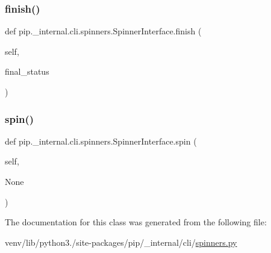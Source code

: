 \subsubsection{\texorpdfstring{finish()}{finish()}}
{\footnotesize\ttfamily def pip.\+\_\+internal.\+cli.\+spinners.\+Spinner\+Interface.\+finish (\begin{DoxyParamCaption}\item[{}]{self,  }\item[{}]{final\+\_\+status }\end{DoxyParamCaption})}

\mbox{\label{classpip_1_1__internal_1_1cli_1_1spinners_1_1SpinnerInterface_ab9ee9b6a6fbfbb7306e9e24d2f247703}} 
\subsubsection{\texorpdfstring{spin()}{spin()}}
{\footnotesize\ttfamily def pip.\+\_\+internal.\+cli.\+spinners.\+Spinner\+Interface.\+spin (\begin{DoxyParamCaption}\item[{}]{self,  }\item[{}]{None }\end{DoxyParamCaption})}



The documentation for this class was generated from the following file\+:\begin{DoxyCompactItemize}
\item 
venv/lib/python3./site-\/packages/pip/\+\_\+internal/cli/\hyperlink{spinners_8py}{spinners.\+py}\end{DoxyCompactItemize}
